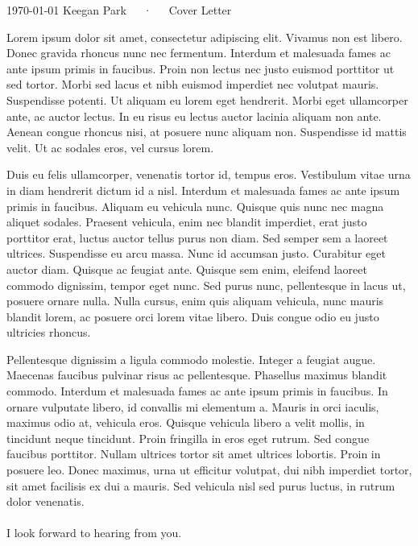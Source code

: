 \documentclass[11pt, a4paper]{awesome-cv}
\begin{document}
\makecvheader[R]

\makecvfooter
  {\today}
  {Keegan Park~~~·~~~Cover Letter}
  {}

\makelettertitle

\begin{cvletter}

Lorem ipsum dolor sit amet, consectetur adipiscing elit. Vivamus non est libero. Donec gravida rhoncus nunc nec fermentum. Interdum et malesuada fames ac ante ipsum primis in faucibus. Proin non lectus nec justo euismod porttitor ut sed tortor. Morbi sed lacus et nibh euismod imperdiet nec volutpat mauris. Suspendisse potenti. Ut aliquam eu lorem eget hendrerit. Morbi eget ullamcorper ante, ac auctor lectus. In eu risus eu lectus auctor lacinia aliquam non ante. Aenean congue rhoncus nisi, at posuere nunc aliquam non. Suspendisse id mattis velit. Ut ac sodales eros, vel cursus lorem.

Duis eu felis ullamcorper, venenatis tortor id, tempus eros. Vestibulum vitae urna in diam hendrerit dictum id a nisl. Interdum et malesuada fames ac ante ipsum primis in faucibus. Aliquam eu vehicula nunc. Quisque quis nunc nec magna aliquet sodales. Praesent vehicula, enim nec blandit imperdiet, erat justo porttitor erat, luctus auctor tellus purus non diam. Sed semper sem a laoreet ultrices. Suspendisse eu arcu massa. Nunc id accumsan justo. Curabitur eget auctor diam. Quisque ac feugiat ante. Quisque sem enim, eleifend laoreet commodo dignissim, tempor eget nunc. Sed purus nunc, pellentesque in lacus ut, posuere ornare nulla. Nulla cursus, enim quis aliquam vehicula, nunc mauris blandit lorem, ac posuere orci lorem vitae libero. Duis congue odio eu justo ultricies rhoncus.

Pellentesque dignissim a ligula commodo molestie. Integer a feugiat augue. Maecenas faucibus pulvinar risus ac pellentesque. Phasellus maximus blandit commodo. Interdum et malesuada fames ac ante ipsum primis in faucibus. In ornare vulputate libero, id convallis mi elementum a. Mauris in orci iaculis, maximus odio at, vehicula eros. Quisque vehicula libero a velit mollis, in tincidunt neque tincidunt. Proin fringilla in eros eget rutrum. Sed congue faucibus porttitor. Nullam ultrices tortor sit amet ultrices lobortis. Proin in posuere leo. Donec maximus, urna ut efficitur volutpat, dui nibh imperdiet tortor, sit amet facilisis ex dui a mauris. Sed vehicula nisl sed purus luctus, in rutrum dolor venenatis.\\\\

I look forward to hearing from you.
\end{cvletter}


\makeletterclosing
\end{document}
